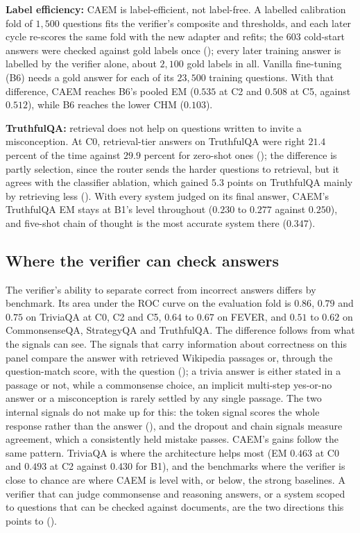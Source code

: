 \textbf{Label efficiency:} CAEM is label-efficient, not label-free. A labelled calibration fold of $1{,}500$ questions fits the verifier's composite and thresholds, and each later cycle re-scores the same fold with the new adapter and refits; the $603$ cold-start answers were checked against gold labels once (); every later training answer is labelled by the verifier alone, about $2{,}100$ gold labels in all. Vanilla fine-tuning (B6) needs a gold answer for each of its $23{,}500$ training questions. With that difference, CAEM reaches B6's pooled EM ($0.535$ at C2 and $0.508$ at C5, against $0.512$), while B6 reaches the lower CHM ($0.103$).

\textbf{TruthfulQA:} retrieval does not help on questions written to invite a misconception. At C0, retrieval-tier answers on TruthfulQA were right $21.4$ percent of the time against $29.9$ percent for zero-shot ones (); the difference is partly selection, since the router sends the harder questions to retrieval, but it agrees with the classifier ablation, which gained $5.3$ points on TruthfulQA mainly by retrieving less (). With every system judged on its final answer, CAEM's TruthfulQA EM stays at B1's level throughout ($0.230$ to $0.277$ against $0.250$), and five-shot chain of thought is the most accurate system there ($0.347$).

\subsection{Where the verifier can check answers}
\label{sec:disc-verifier-scope}

The verifier's ability to separate correct from incorrect answers differs by benchmark. Its area under the ROC curve on the evaluation fold is $0.86$, $0.79$ and $0.75$ on TriviaQA at C0, C2 and C5, $0.64$ to $0.67$ on FEVER, and $0.51$ to $0.62$ on CommonsenseQA, StrategyQA and TruthfulQA. The difference follows from what the signals can see. The signals that carry information about correctness on this panel compare the answer with retrieved Wikipedia passages or, through the question-match score, with the question (); a trivia answer is either stated in a passage or not, while a commonsense choice, an implicit multi-step yes-or-no answer or a misconception is rarely settled by any single passage. The two internal signals do not make up for this: the token signal scores the whole response rather than the answer (), and the dropout and chain signals measure agreement, which a consistently held mistake passes. CAEM's gains follow the same pattern. TriviaQA is where the architecture helps most (EM $0.463$ at C0 and $0.493$ at C2 against $0.430$ for B1), and the benchmarks where the verifier is close to chance are where CAEM is level with, or below, the strong baselines. A verifier that can judge commonsense and reasoning answers, or a system scoped to questions that can be checked against documents, are the two directions this points to ().

